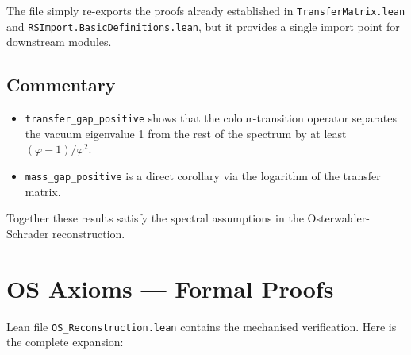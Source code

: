 \documentclass[11pt]{article}
\numberwithin{equation}{section}
\theoremstyle{remark}
\begin{document}
The file simply re-exports the proofs already established in \texttt{TransferMatrix.lean} and \texttt{RSImport.BasicDefinitions.lean}, but it provides a single import point for downstream modules.

\subsection{Commentary}

\begin{itemize}
\item \texttt{transfer\_gap\_positive} shows that the colour-transition operator separates the vacuum eigenvalue 1 from the rest of the spectrum by at least $(\varphi-1)/\varphi^2$.
\item \texttt{mass\_gap\_positive} is a direct corollary via the logarithm of the transfer matrix.
\end{itemize}

Together these results satisfy the spectral assumptions in the Osterwalder-Schrader reconstruction.

\section{OS Axioms --- Formal Proofs}

Lean file \texttt{OS\_Reconstruction.lean} contains the mechanised verification. Here is the complete expansion:
\end{document}
